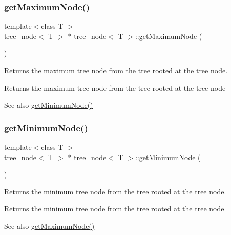 \subsubsection{\texorpdfstring{get\+Maximum\+Node()}{getMaximumNode()}}
{\footnotesize\ttfamily template$<$class T $>$ \\
\hyperlink{classtree__node}{tree\+\_\+node}$<$ T $>$ $\ast$ \hyperlink{classtree__node}{tree\+\_\+node}$<$ T $>$\+::get\+Maximum\+Node (\begin{DoxyParamCaption}{ }\end{DoxyParamCaption})}

Returns the maximum tree node from the tree rooted at the tree node. \begin{DoxyReturn}{Returns}
the maximum tree node from the tree rooted at the tree node 
\end{DoxyReturn}
\begin{DoxySeeAlso}{See also}
\hyperlink{classtree__node_afde196c44a09ac3fe97347d31540ea93}{get\+Minimum\+Node()} 
\end{DoxySeeAlso}
\mbox{\label{classtree__node_afde196c44a09ac3fe97347d31540ea93}} 
\subsubsection{\texorpdfstring{get\+Minimum\+Node()}{getMinimumNode()}}
{\footnotesize\ttfamily template$<$class T $>$ \\
\hyperlink{classtree__node}{tree\+\_\+node}$<$ T $>$ $\ast$ \hyperlink{classtree__node}{tree\+\_\+node}$<$ T $>$\+::get\+Minimum\+Node (\begin{DoxyParamCaption}{ }\end{DoxyParamCaption})}

Returns the minimum tree node from the tree rooted at the tree node. \begin{DoxyReturn}{Returns}
the minimum tree node from the tree rooted at the tree node 
\end{DoxyReturn}
\begin{DoxySeeAlso}{See also}
\hyperlink{classtree__node_a70bdade8011a6a46b083ea680fcea52f}{get\+Maximum\+Node()} 
\end{DoxySeeAlso}
\mbox{\label{classtree__node_a7216e66159b013b47e259555416ec72f}} 
